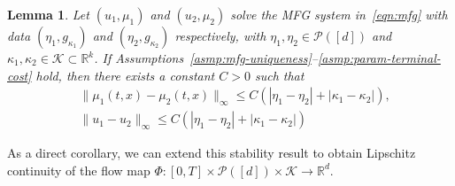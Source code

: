 \documentclass[11pt,reqno]{amsart}
\numberwithin{equation}{section}
\theoremstyle{plain}
\newtheorem{lemma}{Lemma}[section]
\newcommand{\R}{\mathbb{R}}
\newcommand{\calK}{{\mathcal K}}
\newcommand{\calP}{{\mathcal P}}
\newcommand{\1}{\boldsymbol{\mathbbm{1}}}
\begin{document}
\begin{lemma}
\label{lem:final-stability}
Let $(u_1, \mu_1)$ and $(u_2, \mu_2)$ solve the MFG system in~\eqref{eqn:mfg} with data $(\eta_1, g_{\kappa_1})$ and $(\eta_2, g_{\kappa_2})$ respectively, with $\eta_1, \eta_2 \in \calP([d])$ and $\kappa_1, \kappa_2 \in \calK \subset \R^k$. If Assumptions~\ref{asmp:mfg-uniqueness}--\ref{asmp:param-terminal-cost} hold, then there exists a constant $C > 0$ such that
\begin{align}
    &\|\mu_1(t, x) - \mu_2(t, x)\|_\infty \leq C (|\eta_1 - \eta_2| + |\kappa_1 - \kappa_2|), \\
    &\|u_1 - u_2\|_\infty \leq C (|\eta_1 - \eta_2| + |\kappa_1 - \kappa_2|)
\end{align}
\end{lemma}
As a direct corollary, we can extend this stability result to obtain Lipschitz continuity of the flow map $\Phi : [0, T] \times \calP([d]) \times \calK \to \R^d$.
\end{document}
